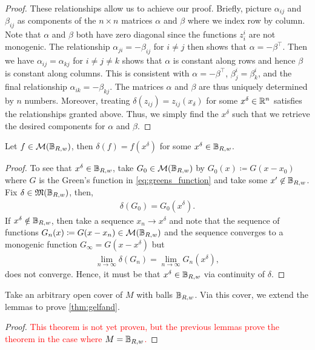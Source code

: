 \begin{proof}
These relationships allow us to achieve our proof. Briefly, picture $\alpha_{ij}$ and $\beta_{ij}$ as components of the $n \times n$ matrices $\alpha$ and $\beta$ where we index row by column. Note that $\alpha$ and $\beta$ both have zero diagonal since the functions $z_i^i$ are not monogenic. The relationship $\alpha_{ji} = -\beta_{ij}$ for $i\neq j$ then shows that $\alpha = -\beta^\top$.  Then we have $\alpha_{ij} = \alpha_{kj}$ for $i\neq j \neq k$ shows that $\alpha$ is constant along rows and hence $\beta$ is constant along columns. This is consistent with $\alpha = -\beta^\top$, $\beta_j^i = \beta_k^i$, and the final relationship $\alpha_{ik} = -\beta_{kj}$. The matrices $\alpha$ and $\beta$ are thus uniquely determined by $n$ numbers.  Moreover, treating $\delta(z_{ij})=z_{ij}(x_\delta)$ for some $x^\delta \in \mathbb{R}^n$ satisfies the relationships granted above. Thus, we simply find the $x^\delta$ such that we retrieve the desired components for $\alpha$ and $\beta$.  
\end{proof}


\begin{lemma}
Let $f\in \mathcal{M}(\mathbb{B}_{R,w})$, then $\delta(f)=f(x^\delta)$ for some $x^\delta \in \mathbb{B}_{R,w}$.
\end{lemma}
\begin{proof}
To see that $x^\delta \in \mathbb{B}_{R,w}$, take $G_0 \in \mathcal{M}(\mathbb{B}_{R,w})$ by $G_0(x)\coloneqq G(x-x_0)$ where $G$ is the Green's function in \cref{eq:greens_function} and take some $x'\not\in \mathbb{B}_{R,w}$. Fix $\delta \in \mathfrak{M}(\mathbb{B}_{R,w})$, then, 
\begin{align}
\delta(G_0)=G_0(x^\delta).
\end{align}
If $x^\delta  \notin \mathbb{B}_{R,w}$, then take a sequence $x_n \to x^\delta$ and note that the sequence of functions $G_n(x)\coloneqq G(x-x_n) \in \mathcal{M}(\mathbb{B}_{R,w})$ and the sequence converges to a monogenic function $G_\infty = G(x-x^\delta)$ but
\begin{align}
\lim_{n\to \infty} \delta(G_n) = \lim_{n\to \infty} G_n(x^\delta),
\end{align}
does not converge. Hence, it must be that $x^\delta \in \mathbb{B}_{R,w}$ via continuity of $\delta$.
\end{proof}

Take an arbitrary open cover of $M$ with balls $\mathbb{B}_{R,w}$. Via this cover, we extend the lemmas to prove \cref{thm:gelfand}.
\begin{proof}
\textcolor{red}{This theorem is not yet proven, but the previous lemmas prove the theorem in the case where $M= \mathbb{B}_{R,w}$.}
\end{proof}